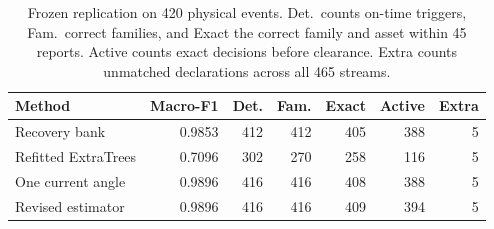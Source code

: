 \begin{table}[t]
\caption{Frozen replication on 420 physical events. Det.\ counts on-time triggers,
Fam.\ correct families, and Exact the correct family and asset within 45 reports.
Active counts exact decisions before clearance. Extra counts unmatched declarations
across all 465 streams.}
\label{tab:network-torque-replication}
\centering\footnotesize
\setlength{\tabcolsep}{2.4pt}
\begin{tabular}{lrrrrrr}
\toprule
Method & Macro-F1 & Det. & Fam. & Exact & Active & Extra \\
\midrule
Recovery bank & 0.9853 & 412 & 412 & 405 & 388 & 5 \\
Refitted ExtraTrees & 0.7096 & 302 & 270 & 258 & 116 & 5 \\
One current angle & 0.9896 & 416 & 416 & 408 & 388 & 5 \\
Revised estimator & 0.9896 & 416 & 416 & 409 & 394 & 5 \\
\bottomrule
\end{tabular}
\end{table}
